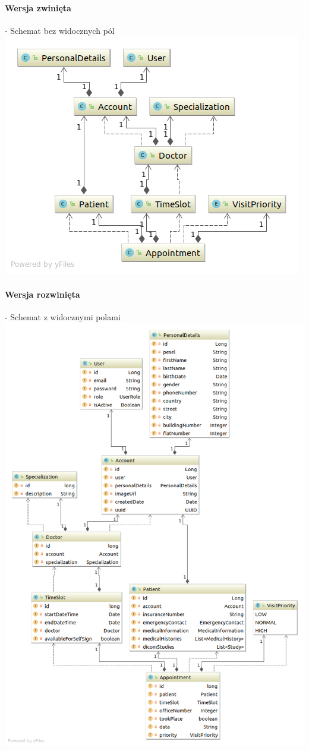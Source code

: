 \documentclass[polish,12pt]{aghthesis}
\begin{document}
\paragraph{Wersja zwinięta} - Schemat bez widocznych pól
\includegraphics[width=\textwidth]{java-entities-small}
\paragraph{Wersja rozwinięta} - Schemat z widocznymi polami \\
\includegraphics[width=\textwidth]{java-entities-big}
\end{document}
